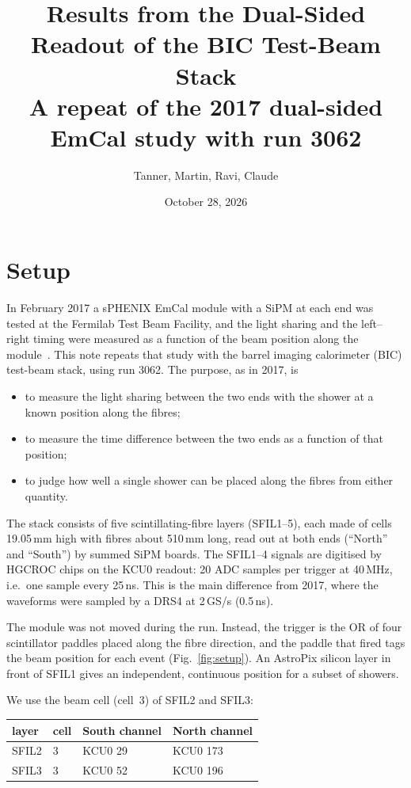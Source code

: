 \documentclass[11pt]{article}
\title{Results from the Dual-Sided Readout of the BIC Test-Beam Stack\\[4pt]\large A repeat of the 2017 dual-sided EmCal study with run 3062}
\author{Tanner, Martin, Ravi, Claude}
\date{October 28, 2026}
\begin{document}
\maketitle

\section*{Setup}

In February 2017 a sPHENIX EmCal module with a SiPM at each end was tested at the Fermilab Test Beam Facility,
and the light sharing and the left--right timing were measured as a function of the beam position along the
module~\cite{note2017}. This note repeats that study with the barrel imaging calorimeter (BIC) test-beam stack,
using run 3062. The purpose, as in 2017, is
\begin{itemize}
  \item to measure the light sharing between the two ends with the shower at a known position along the fibres;
  \item to measure the time difference between the two ends as a function of that position;
  \item to judge how well a single shower can be placed along the fibres from either quantity.
\end{itemize}

The stack consists of five scintillating-fibre layers (SFIL1--5), each made of cells 19.05\,mm high with fibres
about 510\,mm long, read out at both ends (``North'' and ``South'') by summed SiPM boards. The SFIL1--4 signals
are digitised by HGCROC chips on the KCU0 readout: 20 ADC samples per trigger at 40\,MHz, i.e.\ one sample every
25\,ns. This is the main difference from 2017, where the waveforms were sampled by a DRS4 at 2\,GS/s (0.5\,ns).

The module was not moved during the run. Instead, the trigger is the OR of four scintillator paddles placed along
the fibre direction, and the paddle that fired tags the beam position for each event (Fig.~\ref{fig:setup}). An
AstroPix silicon layer in front of SFIL1 gives an independent, continuous position for a subset of showers.

We use the beam cell (cell~3) of SFIL2 and SFIL3:

\begin{center}
\begin{tabular}{llll}
\toprule
layer & cell & South channel & North channel \\
\midrule
SFIL2 & 3 & KCU0 29 & KCU0 173 \\
SFIL3 & 3 & KCU0 52 & KCU0 196 \\
\bottomrule
\end{tabular}
\end{center}
\end{document}
